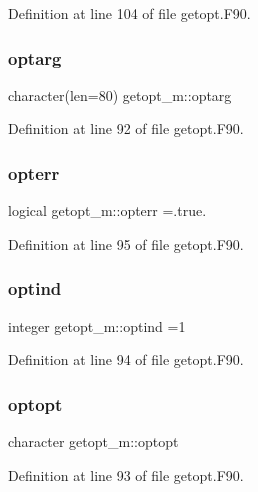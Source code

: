 Definition at line 104 of file getopt.\+F90.

\mbox{\label{namespacegetopt__m_a49ac94befd94285d69af0341beb97638}} 
\subsubsection{\texorpdfstring{optarg}{optarg}}
{\footnotesize\ttfamily character(len=80) getopt\+\_\+m\+::optarg}



Definition at line 92 of file getopt.\+F90.

\mbox{\label{namespacegetopt__m_a3e4c458844fed95e02a7006113230a6f}} 
\subsubsection{\texorpdfstring{opterr}{opterr}}
{\footnotesize\ttfamily logical getopt\+\_\+m\+::opterr =.true.}



Definition at line 95 of file getopt.\+F90.

\mbox{\label{namespacegetopt__m_a41cdbf24b473fe037d94b6311dbeeebc}} 
\subsubsection{\texorpdfstring{optind}{optind}}
{\footnotesize\ttfamily integer getopt\+\_\+m\+::optind =1}



Definition at line 94 of file getopt.\+F90.

\mbox{\label{namespacegetopt__m_acf231054e6ff3ae54d963696c8c270aa}} 
\subsubsection{\texorpdfstring{optopt}{optopt}}
{\footnotesize\ttfamily character getopt\+\_\+m\+::optopt}



Definition at line 93 of file getopt.\+F90.

